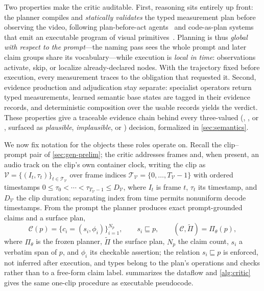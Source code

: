 Two properties make the critic auditable. First, reasoning sits entirely up front: the planner compiles and \emph{statically validates} the typed measurement plan before observing the video, following plan-before-act agents~\cite{rewoo2023,llmcompiler2024} and code-as-plan systems that emit an executable program of visual primitives~\cite{vipergpt2023,visprog2023}. Planning is thus \emph{global with respect to the prompt}---the naming pass sees the whole prompt and later claim groups share its vocabulary---while execution is \emph{local in time}: observations activate, skip, or localize already-declared nodes. With the trajectory fixed before execution, every measurement traces to the obligation that requested it. Second, evidence production and adjudication stay separate: specialist operators return typed measurements, learned semantic base states are tagged in their evidence records, and deterministic composition over the usable records yields the verdict. These properties give a traceable evidence chain behind every three-valued (\supported{}, \contradicted{}, or \unknownv{}, surfaced as \emph{plausible}, \emph{implausible}, or \abstain{}) decision, formalized in \cref{sec:semantics}.

We now fix notation for the objects these roles operate on. Recall the clip--prompt
pair of \cref{sec:gen-prelim}; the critic addresses frames and, when present, an audio
track on the clip's own container clock, writing the clip as
$\mathcal{V}=\{(I_t,\tau_t)\}_{t\in\mathcal{T}_{\mathcal V}}$ over frame indices
$\mathcal{T}_{\mathcal V}=\{0,\ldots,T_{\mathcal V}-1\}$ with ordered timestamps
$0\leq\tau_0<\cdots<\tau_{T_{\mathcal V}-1}\leq D_{\mathcal V}$, where $I_t$ is frame $t$,
$\tau_t$ its timestamp, and $D_{\mathcal V}$ the clip duration; separating index from time
permits nonuniform decode timestamps. From the
prompt the planner produces exact prompt-grounded claims and a surface plan,
\begin{equation}
\mathcal{C}(p)
  = \{c_i=(s_i,\phi_i)\}_{i=1}^{N_p},
\qquad s_i\sqsubseteq p,
\qquad
(\mathcal{C},\widetilde{\Pi})=\Pi_{\theta}(p),
\label{eq:claims-and-plan}
\end{equation}
where $\Pi_{\theta}$ is the frozen planner, $\widetilde{\Pi}$ the surface plan, $N_p$ the
claim count, $s_i$ a verbatim span of $p$, and $\phi_i$ its checkable assertion; the relation
$s_i\sqsubseteq p$ is enforced, not inferred after execution, and types belong to the plan's
operations and checks rather than to a free-form claim label.  summarizes the
dataflow and \cref{alg:critic} gives the same one-clip procedure as executable pseudocode.

